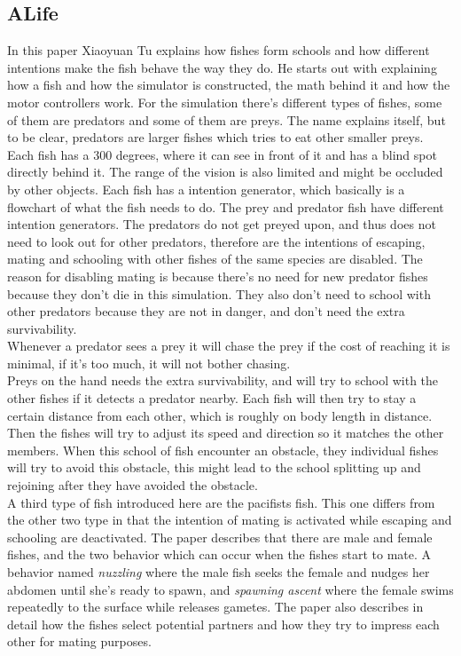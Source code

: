\subsection{ALife}
In this paper Xiaoyuan Tu explains how fishes form schools and how different intentions make the fish behave the way they do. He starts out with explaining how a fish and how the simulator is constructed, the math behind it and how the motor controllers work. For the simulation there's different types of fishes, some of them are predators and some of them are preys. The name explains itself, but to be clear, predators are larger fishes which tries to eat other smaller preys. Each fish has a 300 degrees, where it can see in front of it and has a blind spot directly behind it. 
The range of the vision is also limited and might be occluded by other objects. Each fish has a intention generator, which basically is a flowchart of what the fish needs to do. The prey and predator fish have different intention generators. The predators do not get preyed upon, and thus does not need to look out for other predators, therefore are the intentions of escaping, mating and schooling with other fishes of the same species are disabled. The reason for disabling mating is because there's no need for new predator fishes because they don't die in this simulation. They also don't need to school with other predators because they are not in danger, and don't need the extra survivability.\\
Whenever a predator sees a prey it will chase the prey if the cost of reaching it is minimal, if it's too much, it will not bother chasing. \\
Preys on the hand needs the extra survivability, and will try to school with the other fishes if it detects a predator nearby. Each fish will then try to stay a certain distance from each other, which is roughly on body length in distance. Then the fishes will try to adjust its speed and direction so it matches the other members. When this school of fish encounter an obstacle, they individual fishes will try to avoid this obstacle, this might lead to the school splitting up and rejoining after they have avoided the obstacle. \\
A third type of fish introduced here are the pacifists fish. This one differs from the other two type in that the intention of mating is activated while escaping and schooling are deactivated.
The paper describes that there are male and female fishes, and the two behavior which can occur when the fishes start to mate. A behavior named \textit{nuzzling} where the male fish seeks the female and nudges her abdomen until she's ready to spawn, and \textit{spawning ascent} where the female swims repeatedly to the surface while releases gametes. The paper also describes in detail how the fishes select potential partners and how they try to impress each other for mating purposes.

